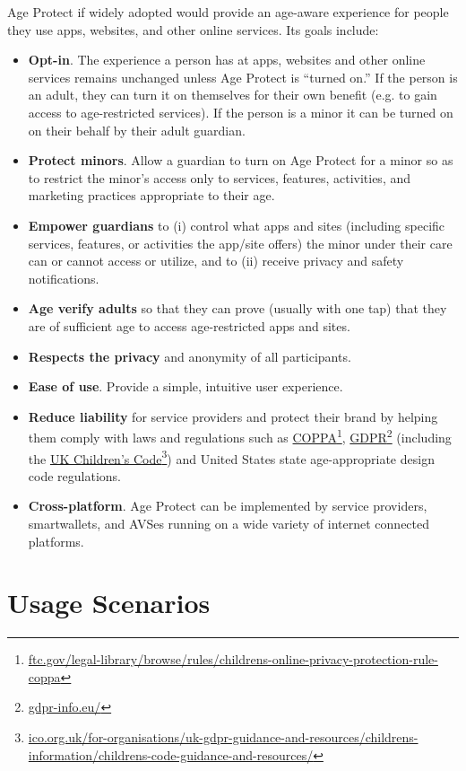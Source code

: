 \documentclass[11pt, oneside]{article}   	%
\newcommand{\hyperfootnote}[1][]{\def\ArgI{{#1}}\hyperfootnoteRelay}
\newcommand\hyperfootnoteRelay[2][]{\href{#1#2}{\ArgI}\footnote{\href{#1#2}{#2}}}
\begin{document}
Age Protect if widely adopted would provide an age-aware experience for people they use apps, websites, and other online services. Its goals include:
\begin{itemize}
	\item \textbf{Opt-in}. The experience a person has at apps, websites and other online services remains unchanged unless Age Protect is ``turned on.'' If the person is an adult, they can turn it on themselves for their own benefit (e.g. to gain access to age-restricted services). If the person is a minor it can be turned on on their behalf by their adult guardian. 
	\item \textbf{Protect minors}. Allow a guardian to turn on Age Protect for a minor so as to restrict the minor's access only to services, features, activities, and marketing practices appropriate to their age.
	\item \textbf{Empower guardians} to (i) control what apps and sites (including specific services, features, or activities the app/site offers) the minor under their care can or cannot access or utilize, and to (ii)  receive privacy and safety notifications.
	\item \textbf{Age verify adults} so that they can prove (usually with one tap) that they are of sufficient age to access age-restricted apps and sites.
	\item \textbf{Respects the privacy} and anonymity of all participants.
	\item \textbf{Ease of use}. Provide a simple, intuitive user experience.
	\item \textbf{Reduce liability} for service providers and protect their brand by helping them comply with laws and regulations such as \hyperfootnote[COPPA][https:]{ftc.gov/legal-library/browse/rules/childrens-online-privacy-protection-rule-coppa}, \hyperfootnote[GDPR][https://]{gdpr-info.eu/} (including the \hyperfootnote[UK Children's Code][https://]{ico.org.uk/for-organisations/uk-gdpr-guidance-and-resources/childrens-information/childrens-code-guidance-and-resources/}) and United States state age-appropriate design code regulations.
	\item \textbf{Cross-platform}. Age Protect can be implemented by service providers, smartwallets, and AVSes running on a wide variety of internet connected platforms.
\end{itemize}

\section{Usage Scenarios} 
\end{document}
